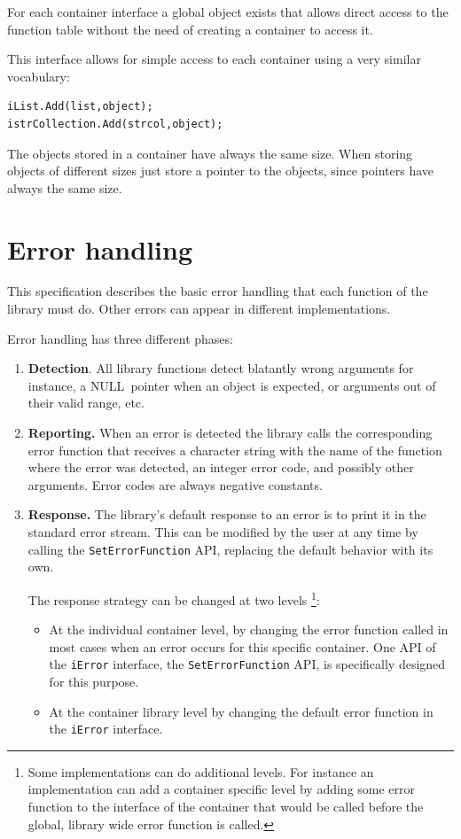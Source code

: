 \documentclass[12pt,a4paper,openany]{memoir} %
\newif\iftth
\newenvironment{ShorterItemize}{
\begin{itemize}
\iftth\else
  \setlength{\itemsep}{1pt}
  \setlength{\parskip}{0pt}
  \setlength{\parsep}{0pt}
\fi
}{\end{itemize}
}
\newcommand{\Null}{{\iftth \ NULL \else \footnotesize NULL\  \fi}}
\begin{document}
For each container interface a global object exists that allows direct access to the function table without the need of creating a container to access it.

This interface allows for simple access to each container using a very similar vocabulary:
\begin{verbatim}
iList.Add(list,object);
istrCollection.Add(strcol,object);
\end{verbatim}
The objects stored in a container have always the same size. When storing objects of different sizes just store a pointer to the objects, since pointers have always the same size.
\section{Error handling}
This specification describes the basic error handling that each function of the library must do. Other errors can appear in different implementations.

Error handling has three different phases:
\begin{enumerate}
\item \textbf{Detection}. All library functions detect blatantly wrong arguments for instance, a \Null pointer when an object is expected, or arguments out of their valid range, etc.
\item \textbf{Reporting.} When an error is detected the library calls the corresponding error function that receives a character string with the name of the 
function where the error was detected, an integer error code, and possibly other arguments. Error codes are always negative constants.
\item \textbf{Response.} The library's default response to an error is to print it in the standard error stream. This can be modified by the user at any time by calling the \texttt{SetErrorFunction} API, replacing the default behavior with its own.

The response strategy can be changed at two levels \footnote
{Some implementations can do additional levels. For instance an implementation can add a container specific level by adding some error function
to the interface of the container that would be called before the global, library wide error function is called.}:
\begin{ShorterItemize}
\item At the individual container level, by changing the error function called in  most cases when an error occurs for this specific container. One API of the \verb,iError, interface, the \verb,SetErrorFunction, API, is specifically designed for this purpose.
\item At the container library level by changing the default error function in the \verb,iError, interface.
\end{ShorterItemize}

\end{enumerate}
\end{document}
